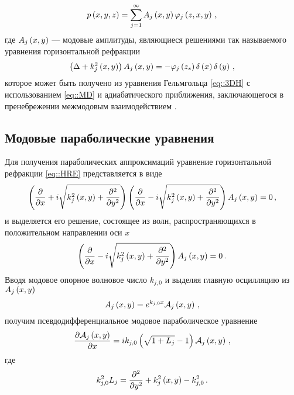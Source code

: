 \documentclass[../document.tex]{subfiles}
\begin{document}
			\begin{equation}\label{eq::MD}
				p\left(x,y,z\right)=\sum\limits_{j=1}^\infty A_j\left(x,y\right)\varphi_j\left(z,x,y\right)\,,
			\end{equation}
			где $A_j\left(x,y\right)$ --- модовые амплитуды, являющиеся решениями так называемого уравнения горизонтальной рефракции
			\begin{equation}\label{eq::HRE}
				\left(\Delta+k_j^2\left(x,y\right)\right)A_j\left(x,y\right)=-\varphi_j\left(z_s\right)\delta\left(x\right)\delta\left(y\right)\,,
			\end{equation}
            которое может быть получено из уравнения Гельмгольца \eqref{eq::3DH} с использованием \eqref{eq::MD} и адиабатического приближения, заключающегося в пренебрежении межмодовым взаимодействием \cite{jensen}.
		\subsection{Модовые параболические уравнения}
			\par Для получения параболических аппроксимаций уравнение горизонтальной рефракции \eqref{eq::HRE} представляется в виде
			\begin{equation}
				\left(\frac{\partial}{\partial x}+i\sqrt{k_j^2\left(x,y\right)+\frac{\partial^2}{\partial y^2}}\right)\left(\frac{\partial}{\partial x}-i\sqrt{k_j^2\left(x,y\right)+\frac{\partial^2}{\partial y^2}}\right)A_j\left(x,y\right)=0\,,
			\end{equation}
			и выделяется его решение, состоящее из волн, распространяющихся в положительном направлении оси $x$
			\begin{equation}
				\left(\frac{\partial}{\partial x}-i\sqrt{k_j^2\left(x,y\right)+\frac{\partial^2}{\partial y^2}}\right)A_j\left(x,y\right)=0\,.
			\end{equation}
			Вводя модовое опорное волновое число $k_{j,0}$ и выделяя главную осцилляцию из $A_j\left(x,y\right)$
			\begin{equation}
				A_j\left(x,y\right)=e^{k_{j,0}x}\mathcal{A}_j\left(x,y\right)\,,\nonumber
			\end{equation}
			получим псевдодифференциальное модовое параболическое уравнение
			\begin{equation}\label{eq::PDMPE}
				\frac{\partial\mathcal{A}_j\left(x,y\right)}{\partial x}=ik_{j,0}\left(\sqrt{1+L_j}-1\right)\mathcal{A}_j\left(x,y\right)\,,
			\end{equation}
			где 
			\begin{equation}
				k_{j,0}^2L_j=\frac{\partial^2}{\partial y^2}+k_j^2\left(x,y\right)-k_{j,0}^2\,.\nonumber
			\end{equation}
\end{document}
